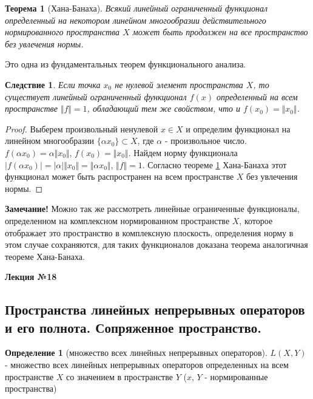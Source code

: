 \documentclass[14pt,a4paper]{extarticle}
\newtheorem{theorem}{Теорема}[section]
\newtheorem{corollary}{Следствие}[theorem]
\theoremstyle{definition}
\newtheorem{definition}{Определение}[section]
\theoremstyle{remark}
\renewcommand{\[}{\begin{dmath*}[compact]}
\renewcommand{\]}{\end{dmath*}}
\begin{document}
\begin{theorem}[Хана-Банаха]
\label{th:Хана-Банаха}
  Всякий линейный ограниченный функционал определенный на некотором
  линейном многообразии действительного нормированного пространства $X$
  может быть продолжен на все пространство без увлечения нормы.
\end{theorem}

Это одна из фундаментальных теорем функционального анализа.

\begin{corollary}
  Если точка $x_0$ не нулевой элемент пространства $X$, то существует линейный
  ограниченный функционал $f(x)$ определенный на всем пространстве
  $\Vert f \Vert = 1$, обладающий тем же свойством, что и
  $f(x_0) = \Vert x_0 \Vert$.
\end{corollary}

\begin{proof}
  Выберем произвольный ненулевой $x \in X$ и определим функционал на
  линейном многообразии $\{\alpha x_0\} \subset X$,
  где $\alpha$ - произвольное число.
  $f(\alpha x_0) = \alpha \Vert x_0 \Vert$, $f(x_0) = \Vert x_0 \Vert$.
  Найдем норму функционала $|f(\alpha x_0)| = |\alpha| \Vert x_0 \Vert =
  \Vert \alpha x_0 \Vert$, $\Vert f \Vert = 1$. Согласно теореме
  \ref{th:Хана-Банаха} Хана-Банаха этот функционал может быть распространен
  на всем пространстве $X$ без увлечения нормы.
\end{proof}

\textbf{Замечание!} Можно так же рассмотреть линейные ограниченные функционалы,
определенном на комплексном нормированном пространстве $X$, которое отображает
это пространство в комплексную плоскость, определения норму в этом случае
сохраняются, для таких функционалов доказана теорема аналогичная теореме
Хана-Банаха.

\textbf{Лекция №18}

\subsection{Пространства линейных непрерывных операторов и его полнота.
Сопряженное пространство.}

\begin{definition}[множество всех линейных непрерывных операторов]
  $L(X,Y)$ - множество всех линейных непрерывных операторов определенных на всем
  пространстве $X$ со значением в пространстве $Y$ ($x$, $Y$ - нормированные
  пространства)
\end{definition}
\end{document}
